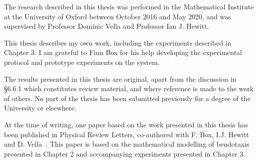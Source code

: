 \begin{preface}
The research described in this thesis was performed in the Mathematical Institute at the University of Oxford between October 2016 and May 2020, and was supervised by Professor Dominic Vella and Professor Ian J. Hewitt.

This thesis describes my own work, including the experiments described in Chapter 3. I am grateful to Finn Box for his help developing the experimental protocol and prototype experiments on the system. 

The results presented in this thesis are original, apart from the discussion in \S6.6.1 which constitutes review material, and where reference is made to the work of others. No part of the thesis has been submitted previously for a degree of the University or elsewhere.

At the time of writing, one paper based on the work presented in this thesis has been published in Physical Review Letters, co-authored with F. Box, I.J. Hewitt and D. Vella~\citep{Bradley2019PRL}. This paper is based on the mathematical modelling of bendotaxis presented in Chapter 2 and accompanying experiments presented in Chapter 3.
\end{preface}